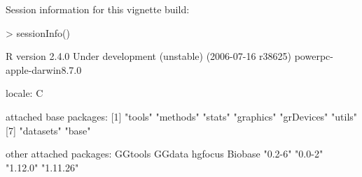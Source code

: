 \documentclass[12pt]{article}
\begin{document}
Session information for this vignette build:
\begin{Schunk}
\begin{Sinput}
> sessionInfo()
\end{Sinput}
\begin{Soutput}
R version 2.4.0 Under development (unstable) (2006-07-16 r38625) 
powerpc-apple-darwin8.7.0 

locale:
C

attached base packages:
[1] "tools"     "methods"   "stats"     "graphics"  "grDevices" "utils"    
[7] "datasets"  "base"     

other attached packages:
  GGtools    GGdata   hgfocus   Biobase 
  "0.2-6"   "0.0-2"  "1.12.0" "1.11.26" 
\end{Soutput}
\end{Schunk}
\end{document}
